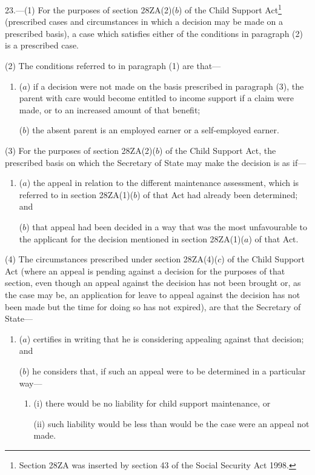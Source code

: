 \documentclass[12pt,a4paper]{article}
\begin{document}
23.—(1) For the purposes of section 28ZA(2)($b$) of the Child Support Act\footnote{\frenchspacing Section 28ZA was inserted by section 43 of the Social Security Act 1998.} (prescribed cases and circumstances in which a decision may be made on a prescribed basis), a case which satisfies either of the conditions in paragraph (2) is a prescribed case.

(2) The conditions referred to in paragraph (1) are that—
\begin{enumerate}\item[]
($a$) if a decision were not made on the basis prescribed in paragraph (3), the parent with care would become entitled to income support if a claim were made, or to an increased amount of that benefit;

($b$) the absent parent is an employed earner or a self-employed earner.
\end{enumerate}

(3) For the purposes of section 28ZA(2)($b$) of the Child Support Act, the prescribed basis on which the Secretary of State may make the decision is as if—
\begin{enumerate}\item[]
($a$) the appeal in relation to the different maintenance assessment, which is referred to in section 28ZA(1)($b$) of that Act had already been determined; and

($b$) that appeal had been decided in a way that was the most unfavourable to the applicant for the decision mentioned in section 28ZA(1)($a$) of that Act.
\end{enumerate}

(4) The circumstances prescribed under section 28ZA(4)($c$) of the Child Support Act (where an appeal is pending against a decision for the purposes of that section, even though an appeal against the decision has not been brought or, as the case may be, an application for leave to appeal against the decision has not been made but the time for doing so has not expired), are that the Secretary of State—
\begin{enumerate}\item[]
($a$) certifies in writing that he is considering appealing against that decision; and

($b$) he considers that, if such an appeal were to be determined in a particular way—
\begin{enumerate}\item[]
(i) there would be no liability for child support maintenance, or

(ii) such liability would be less than would be the case were an appeal not made.
\end{enumerate}
\end{enumerate}
\end{document}

